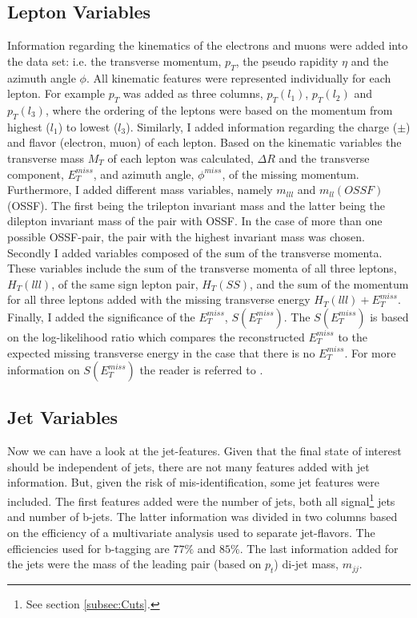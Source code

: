 \subsection{Lepton Variables}\label{subsec:LepSel}
Information regarding the kinematics of the electrons and muons were added into the data set: i.e. the transverse momentum, $p_T$, the pseudo 
rapidity $\eta$ and the azimuth angle $\phi$. All kinematic features were represented individually for each lepton. For example $p_T$
was added as three columns, $p_T(l_1)$, $p_T(l_2)$ and $p_T(l_3)$, where the ordering of the leptons were based on the momentum from highest ($l_1$) to lowest ($l_3$).
Similarly, I added information regarding the charge ($\pm$) and flavor (electron, muon) of each lepton. Based on the kinematic variables
the transverse mass $M_T$ of each lepton was calculated, $\Delta R$ and the transverse component, $E_T^{miss}$, and azimuth angle, $\phi^{miss}$,
of the missing momentum.
\\
Furthermore, I added different mass variables, namely $m_{lll}$ and $m_{ll}(OSSF)$ (\ac{OSSF}). The first being the trilepton invariant mass 
and the latter being the dilepton invariant mass of the pair with \ac{OSSF}. In the case of more than one possible \ac{OSSF}-pair,
the pair with the highest invariant mass was chosen. Secondly I added variables composed of the sum of the transverse momenta.
These variables include the sum of the transverse momenta of all three leptons, $H_T(lll)$, of the same sign lepton pair, $H_T(SS)$, and the sum of 
the momentum for all three leptons added with the missing transverse energy $H_T(lll) + E_T^{miss}$. Finally, I added the significance of the
$E_T^{miss}$, $S(E_T^{miss})$. The $S(E_T^{miss})$ is based on the log-likelihood ratio which compares the reconstructed $E_T^{miss}$ to 
the expected missing transverse energy in the case that there is no $E_T^{miss}$. For more information on $S(E_T^{miss})$ the reader is 
referred to \cite{object_based_2018}.
\subsection{Jet Variables}\label{subsec:JetSel}
Now we can have a look at the jet-features. Given that the final state of interest should be independent of jets, there are 
not many features added with jet information. But, given the risk of mis-identification, some jet features were included. The 
first features added were the number of jets, both all signal\footnote{See section \ref{subsec:Cuts}.} jets and number of b-jets.
The latter information was divided in two columns based on the efficiency of a multivariate analysis used to separate jet-flavors.
The efficiencies used for b-tagging are $77\%$ and $85\%$. The last information added for the jets were the mass of the leading pair 
(based on $p_t$) di-jet mass, $m_{jj}$.
